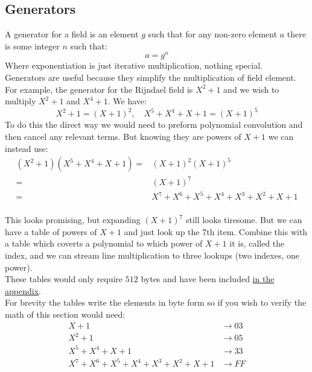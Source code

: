\subsection{Generators}
A generator for a field is an element $g$ such that for any non-zero element $a$ there is some integer $n$ such that:
\[ a = g^n\]
Where exponentiation is just iterative multiplication, nothing special.
\\

Generators are useful because they simplify the multiplication of field element.
For example,
the generator for the Rijndael field is $X^2+1$ and we wish to multiply $X^2+1$ and $X^4+1$.
We have:
\[X^2+1 = (X+1)^2,\quad X^5+X^4+X+1 = (X+1)^5\]
To do this the direct way we would need to preform polynomial convolution and then cancel any relevant terms.
But knowing they are powers of $X+1$ we can instead use:
\begin{equation*}
\begin{aligned}
	(X^2+1)(X^5+X^4+X+1) =& (X+1)^2(X+1)^5\\
	=& (X+1)^7 \\
	=& X^7+X^6+X^5+X^4+X^3+X^2+X+1\\
\end{aligned}
\end{equation*}

This looks promising,
but expanding $(X+1)^7$ still looks tiresome.
But we can have a table of powers of $X+1$ and just look up the $7$th item.
Combine this with a table which coverts a polynomial to which power of $X+1$ it is,
called the index,
and we can stream line multiplication to three lookups (two indexes, one power).
\\

These tables would only require $512$ bytes and have been included \hyperref[appx:gen-table]{in the appendix}.
\\

For brevity the tables write the elements in byte form so if you wish to verify the math of this section would need:
\begin{equation*}
\begin{aligned}
	X+1 &\rightarrow 03\\
	X^2+1 & \rightarrow 05\\
	X^5+X^4+X+1 & \rightarrow 33\\
	X^7+X^6+X^5+X^4+X^3+X^2+X+1 &\rightarrow FF\\
\end{aligned}
\end{equation*}

